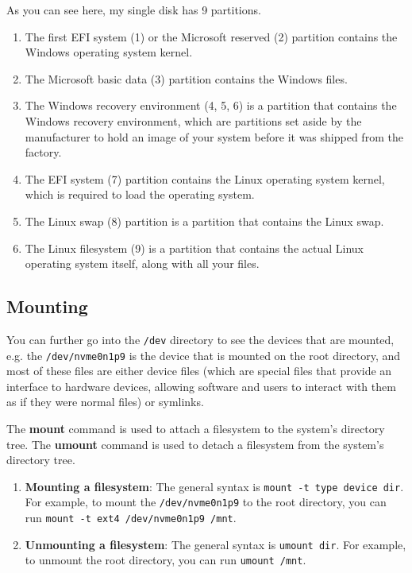 \documentclass{article}
\newcounter{example}[section]
\begin{document}
  As you can see here, my single disk has 9 partitions. 
  \begin{enumerate} 
    \item The first EFI system (1) or the Microsoft reserved (2) partition contains the Windows operating system kernel. 
    \item The Microsoft basic data (3) partition contains the Windows files.
    \item  The Windows recovery environment (4, 5, 6) is a partition that contains the Windows recovery environment, which are partitions set aside by the manufacturer to hold an image of your system before it was shipped from the factory. 
    \item The EFI system (7) partition contains the Linux operating system kernel, which is required to load the operating system. 
    \item The Linux swap (8) partition is a partition that contains the Linux swap. 
    \item The Linux filesystem (9) is a partition that contains the actual Linux operating system itself, along with all your files.
  \end{enumerate}


  \subsection{Mounting} 

    You can further go into the \texttt{/dev} directory to see the devices that are mounted, e.g. the \texttt{/dev/nvme0n1p9} is the device that is mounted on the root directory, and most of these files are either device files (which are special files that provide an interface to hardware devices, allowing software and users to interact with them as if they were normal files) or symlinks.

    The \textbf{mount} command is used to attach a filesystem to the system's directory tree. The \textbf{umount} command is used to detach a filesystem from the system's directory tree. 

    \begin{enumerate}
      \item \textbf{Mounting a filesystem}: The general syntax is \texttt{mount -t type device dir}. For example, to mount the \texttt{/dev/nvme0n1p9} to the root directory, you can run \texttt{mount -t ext4 /dev/nvme0n1p9 /mnt}. 
      \item \textbf{Unmounting a filesystem}: The general syntax is \texttt{umount dir}. For example, to unmount the root directory, you can run \texttt{umount /mnt}. 
    \end{enumerate}
\end{document}
